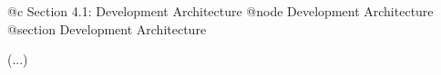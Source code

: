 @c Section 4.1: Development Architecture
@node Development Architecture
@section Development Architecture

(...)
